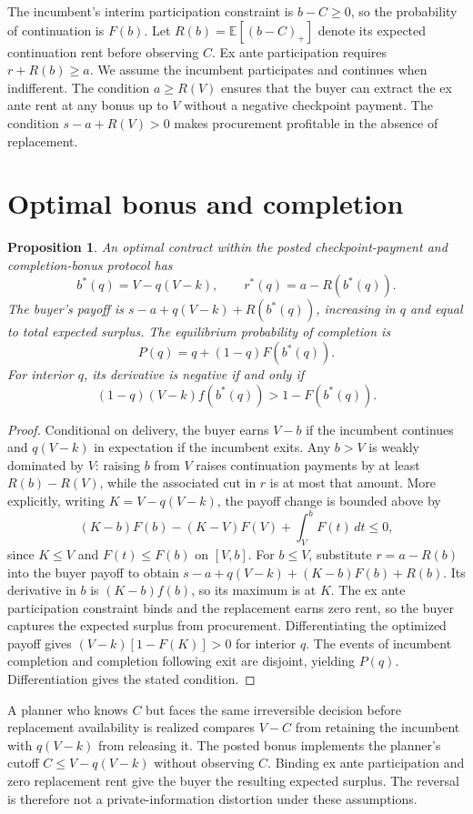 \documentclass[11pt]{article}
\newtheorem{proposition}{Proposition}
\begin{document}
The incumbent's interim participation constraint is $b-C\geq 0$, so the probability of continuation is $F(b)$. Let $R(b)=\mathbb E[(b-C)_+]$ denote its expected continuation rent before observing $C$. Ex ante participation requires $r+R(b)\geq a$. We assume the incumbent participates and continues when indifferent. The condition $a\geq R(V)$ ensures that the buyer can extract the ex ante rent at any bonus up to $V$ without a negative checkpoint payment. The condition $s-a+R(V)>0$ makes procurement profitable in the absence of replacement.
\section{Optimal bonus and completion}
\begin{proposition}
An optimal contract within the posted checkpoint-payment and completion-bonus protocol has
\[
 b^*(q)=V-q(V-k),\qquad r^*(q)=a-R(b^*(q)).
\]
The buyer's payoff is $s-a+q(V-k)+R(b^*(q))$, increasing in $q$ and equal to total expected surplus. The equilibrium probability of completion is
\[
 P(q)=q+(1-q)F(b^*(q)).
\]
For interior $q$, its derivative is negative if and only if
\[
 (1-q)(V-k)f(b^*(q))>1-F(b^*(q)).
\]
\end{proposition}

\begin{proof}
Conditional on delivery, the buyer earns $V-b$ if the incumbent continues and $q(V-k)$ in expectation if the incumbent exits. Any $b>V$ is weakly dominated by $V$: raising $b$ from $V$ raises continuation payments by at least $R(b)-R(V)$, while the associated cut in $r$ is at most that amount. More explicitly, writing $K=V-q(V-k)$, the payoff change is bounded above by
\[
 (K-b)F(b)-(K-V)F(V)+\int_V^b F(t)\,dt\leq 0,
\]
since $K\leq V$ and $F(t)\leq F(b)$ on $[V,b]$. For $b\leq V$, substitute $r=a-R(b)$ into the buyer payoff to obtain $s-a+q(V-k)+(K-b)F(b)+R(b)$. Its derivative in $b$ is $(K-b)f(b)$, so its maximum is at $K$. The ex ante participation constraint binds and the replacement earns zero rent, so the buyer captures the expected surplus from procurement. Differentiating the optimized payoff gives $(V-k)[1-F(K)]>0$ for interior $q$. The events of incumbent completion and completion following exit are disjoint, yielding $P(q)$. Differentiation gives the stated condition.
\end{proof}

A planner who knows $C$ but faces the same irreversible decision before replacement availability is realized compares $V-C$ from retaining the incumbent with $q(V-k)$ from releasing it. The posted bonus implements the planner's cutoff $C\leq V-q(V-k)$ without observing $C$. Binding ex ante participation and zero replacement rent give the buyer the resulting expected surplus. The reversal is therefore not a private-information distortion under these assumptions.
\end{document}
